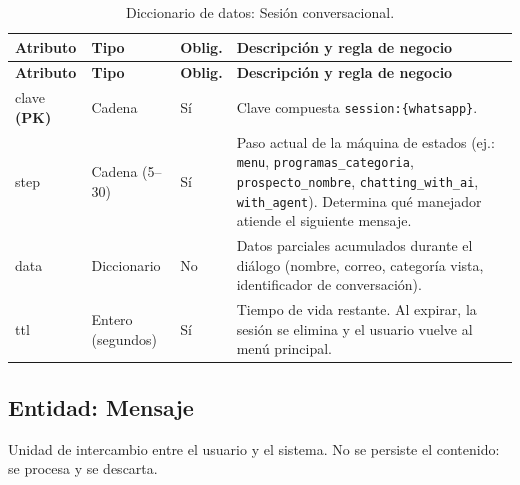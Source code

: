 \documentclass[12pt,a4paper]{report}
\newcommand{\tablacompacta}{\setstretch{1.1}\small}
\newcommand{\cabecera}[1]{\rowcolor{filacabecera}#1}
\begin{document}
{\tablacompacta
\begin{longtable}{p{3.1cm}p{2.2cm}p{1.3cm}p{6.0cm}}
\caption{Diccionario de datos: Sesión conversacional.}\label{tab:dd-sesion}\\
\toprule
\cabecera{\textbf{Atributo}} & \textbf{Tipo} & \textbf{Oblig.} & \textbf{Descripción y regla de negocio} \\
\midrule
\endfirsthead
\toprule
\textbf{Atributo} & \textbf{Tipo} & \textbf{Oblig.} & \textbf{Descripción y regla de negocio} \\
\midrule
\endhead
\bottomrule
\endfoot
clave \textbf{(PK)} & Cadena & Sí & Clave compuesta \texttt{session:\{whatsapp\}}. \\
step & Cadena (5--30) & Sí & Paso actual de la máquina de estados (ej.: \texttt{menu}, \texttt{programas\_categoria}, \texttt{prospecto\_nombre}, \texttt{chatting\_with\_ai}, \texttt{with\_agent}). Determina qué manejador atiende el siguiente mensaje. \\
data & Diccionario & No & Datos parciales acumulados durante el diálogo (nombre, correo, categoría vista, identificador de conversación). \\
ttl & Entero (segundos) & Sí & Tiempo de vida restante. Al expirar, la sesión se elimina y el usuario vuelve al menú principal. \\
\end{longtable}}

\subsection{Entidad: Mensaje}

Unidad de intercambio entre el usuario y el sistema. No se persiste el contenido: se procesa y se
descarta.
\end{document}
